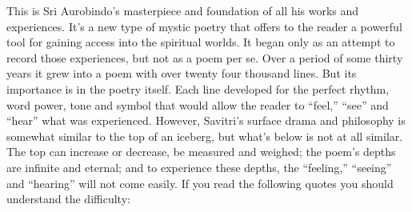 \documentclass[12pt,a4paper]{book}
\begin{document}
This is Sri Aurobindo's masterpiece and foundation of all his works
and experiences.  It's a new type of mystic poetry that offers to the
reader a powerful tool for gaining access into the spiritual worlds.
It began only as an attempt to record those experiences, but not as a
poem per se. Over a period of some thirty years it grew into a poem
with over twenty four thousand lines. But its importance is in the
poetry itself. Each line developed for the perfect rhythm, word power,
tone and symbol that would allow the reader to ``feel,'' ``see'' and
``hear'' what was experienced. However, Savitri's surface drama and
philosophy is somewhat similar to the top of an iceberg, but what's
below is not at all similar. The top can increase or decrease, be
measured and weighed; the poem's depths are infinite and eternal; and
to experience these depths, the ``feeling,'' ``seeing'' and
``hearing'' will not come easily. If you read the following quotes you
should understand the difficulty:
\end{document}
